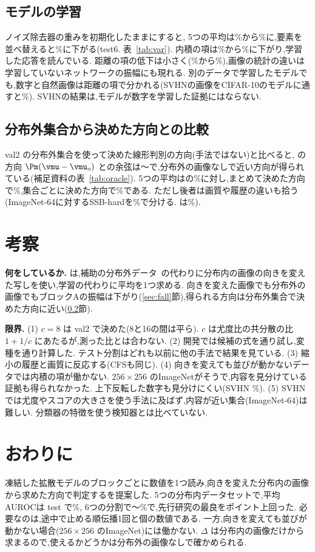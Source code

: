 \subsection{モデルの学習}
\label{sec:model}
ノイズ除去器の重みを初期化したままにすると, 5つの平均は\olVarTrained\%から\olVarRinit\%に,要素を並べ替えると\olVarRshuf\%に下がる(test6. 表~\ref{tab:var}). 内積の項は\olVarTrainedL\%から\olVarRinitL\%に下がり,学習した応答を読んでいる. 距離の項の低下は小さく(\olVarTrainedT\%から\olVarRinitT\%),画像の統計の違いは学習していないネットワークの振幅にも現れる. 別のデータで学習したモデルでも,数字と自然画像は距離の項で分かれる(SVHNの画像をCIFAR-10のモデルに通すと\olVarByMax\%). SVHNの結果は,モデルが数字を学習した証拠にはならない.

\subsection{分布外集合から決めた方向との比較}
\label{sec:oracle}
val2 の分布外集合を使って決めた線形判別の方向(手法ではない)と比べると, \Ours{}の方向 $\Pm(\vmu-\vmu_{o})$ との余弦は\olCosMin{}〜\olCosMax{}で,分布外の画像なしで近い方向が得られている(補足資料の表~\ref{tab:oracle}). 5つの平均は\Ours{}の\olXOLR\%に対し,まとめて決めた方向で\olXPool\%,集合ごとに決めた方向で\olXSet\%である. ただし後者は画質や履歴の違いも拾う(ImageNet-64に対するSSB-hardを\olXSsbSet\%で分ける. \Ours{}は\olXSsbOLR\%).

\section{考察}
\label{sec:disc}
\textbf{何をしているか.} \Ours{}は,補助の分布外データ~\cite{hendrycks2019oe}の代わりに分布内の画像の向きを変えた写しを使い,学習の代わりに平均を1つ求める. 向きを変えた画像でも分布外の画像でもブロックAの振幅は下がり(\ref{sec:fall}節),得られる方向は分布外集合で決めた方向に近い(\ref{sec:oracle}節).

\textbf{限界.} (1) $c=8$ は val2 で決めた(8と16の間は平ら). $c$ は尤度比の共分散の比 $1+1/c$ にあたるが,測った比とは合わない. (2) 開発では候補の式を\olNDev{}通り試し,変種を\olNVar{}通り計算した. テスト分割はどれも以前に他の手法で結果を見ている. (3) 縮小の履歴と画質に反応する(CFSも同じ). (4) 向きを変えても並びが動かないデータでは内積の項が働かない. $256{\times}256$ のImageNetがそうで,内容を見分けている証拠も得られなかった. 上下反転した数字も見分けにくい(SVHN \olSixVfSVHN\%). (5) SVHNでは尤度やスコアの大きさを使う手法に及ばず,内容が近い集合(ImageNet-64)は難しい. 分類器の特徴を使う検知器とは比べていない.

\section{おわりに}
凍結した拡散モデルのブロックごとに数値を1つ読み,向きを変えた分布内の画像から求めた方向で判定する\Ours{}を提案した. 5つの分布内データセットで,平均AUROCは test で\olTestOL\%, 6つの分割で\olSixMin{}〜\olSixMax\%で,先行研究の最良を\olGapCfsKnn{}ポイント上回った. 必要なのは,途中で止める順伝播1回と\olNStored{}個の数値である. 一方,向きを変えても並びが動かない場合($256{\times}256$ のImageNet)には働かない. $\Delta$ は分布内の画像だけから求まるので,使えるかどうかは分布外の画像なしで確かめられる.
